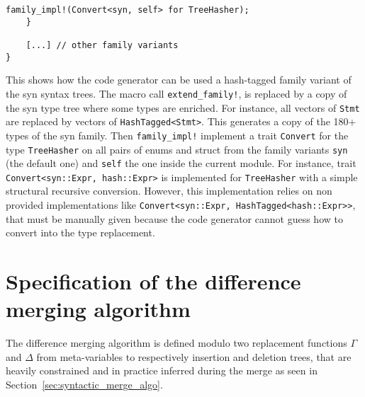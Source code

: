 \documentclass[a4paper,11pt]{article}
\begin{document}
\begin{appendices}
\begin{lstlisting}[label=lst:codegen, caption={Usage example of the code generator for creating the hash-tagged family variant}]
        family_impl!(Convert<syn, self> for TreeHasher);
    }

    [...] // other family variants
}
\end{lstlisting}

This shows how the code generator can be used a hash-tagged family variant of the syn syntax trees. The macro call \verb$extend_family!$, is replaced by a copy of the syn type tree where some types are enriched.
For instance, all vectors of \verb$Stmt$ are replaced by vectors of \verb$HashTagged<Stmt>$. This generates a copy of the 180+ types of the syn family. Then \verb$family_impl!$ implement a trait \verb$Convert$ for the type \verb$TreeHasher$ on all pairs of enums and struct from the family variants \verb$syn$ (the default one) and \verb$self$ the one inside the current module. For instance, trait \verb$Convert<syn::Expr, hash::Expr>$ is implemented for \verb$TreeHasher$ with a simple structural recursive conversion. However, this implementation relies on non provided implementations like \verb$Convert<syn::Expr, HashTagged<hash::Expr>>$, that must be manually given because the code generator cannot guess how to convert into the type replacement.

\section{Specification of the difference merging algorithm}
\label{app:syntactic_merge_spec}

The difference merging algorithm is defined modulo two replacement
functions $\Gamma$ and $\Delta$ from meta-variables to respectively
insertion and deletion trees, that are heavily constrained and in
practice inferred during the merge as seen in Section~\ref{sec:syntactic_merge_algo}.


\end{appendices}
\end{document}
